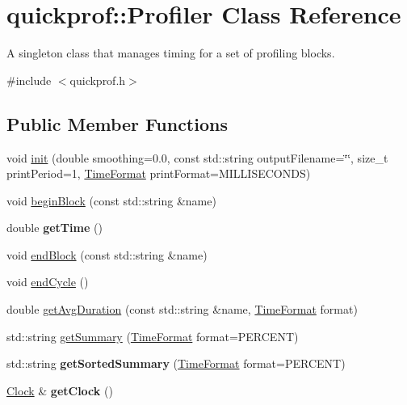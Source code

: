 \hypertarget{classquickprof_1_1_profiler}{
\section{quickprof::Profiler Class Reference}
\label{classquickprof_1_1_profiler}
}


A singleton class that manages timing for a set of profiling blocks.  


{\ttfamily \#include $<$quickprof.h$>$}\subsection*{Public Member Functions}
\begin{DoxyCompactItemize}
\item 
void \hyperlink{classquickprof_1_1_profiler_a53b1240186436954cabca9b492f0ab61}{init} (double smoothing=0.0, const std::string outputFilename=\char`\"{}\char`\"{}, size\_\-t printPeriod=1, \hyperlink{namespacequickprof_a9bd89a54bb92c3d77f445ca65cb4684f}{TimeFormat} printFormat=MILLISECONDS)
\item 
void \hyperlink{classquickprof_1_1_profiler_a7606c62bd3c384bfdbce1ff9413693dd}{beginBlock} (const std::string \&name)
\item 
\hypertarget{classquickprof_1_1_profiler_aae93f88872fce78aa5e718c5ac315e68}{
double {\bfseries getTime} ()}
\label{classquickprof_1_1_profiler_aae93f88872fce78aa5e718c5ac315e68}

\item 
void \hyperlink{classquickprof_1_1_profiler_ae122d033874481835099e7b7f9989642}{endBlock} (const std::string \&name)
\item 
void \hyperlink{classquickprof_1_1_profiler_a158610937cac5c9efcb36534c1c47f76}{endCycle} ()
\item 
double \hyperlink{classquickprof_1_1_profiler_aeac4d5f0f3c8aab4ca1c51b4ddf7601d}{getAvgDuration} (const std::string \&name, \hyperlink{namespacequickprof_a9bd89a54bb92c3d77f445ca65cb4684f}{TimeFormat} format)
\item 
std::string \hyperlink{classquickprof_1_1_profiler_aa05f7c66bdaa565267235dc76671bf1e}{getSummary} (\hyperlink{namespacequickprof_a9bd89a54bb92c3d77f445ca65cb4684f}{TimeFormat} format=PERCENT)
\item 
\hypertarget{classquickprof_1_1_profiler_aacba1a5bb0e4f400035ee93ba7df7fd8}{
std::string {\bfseries getSortedSummary} (\hyperlink{namespacequickprof_a9bd89a54bb92c3d77f445ca65cb4684f}{TimeFormat} format=PERCENT)}
\label{classquickprof_1_1_profiler_aacba1a5bb0e4f400035ee93ba7df7fd8}

\item 
\hypertarget{classquickprof_1_1_profiler_a28c54ae3897dd8c68ee12c9007166e48}{
\hyperlink{classquickprof_1_1_clock}{Clock} \& {\bfseries getClock} ()}
\label{classquickprof_1_1_profiler_a28c54ae3897dd8c68ee12c9007166e48}

\end{DoxyCompactItemize}
